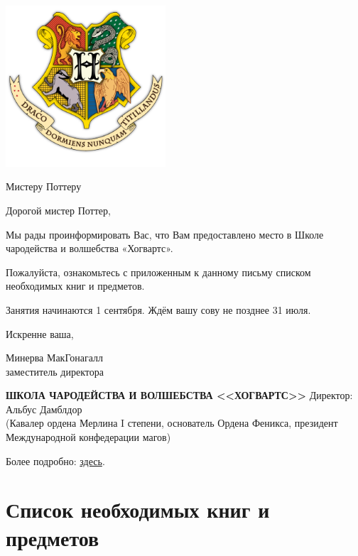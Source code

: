 \documentclass[14pt, a4paper]{article}
\begin{document}
	
\begin{titlepage}
\cfoot{}

	\begin{center}
	\includegraphics[height=6cm]{Hogwarts.png}
	\end{center}

{\fontsize{12pt}{1cm}\selectfont 
	Мистеру Поттеру}

\vspace{2.5cm}

Дорогой мистер Поттер,\par
Мы рады проинформировать Вас, что Вам предоставлено место в Школе чародейства и волшебства «Хогвартс».\par Пожалуйста, ознакомьтесь с приложенным к данному письму списком необходимых книг и предметов.\par
Занятия начинаются 1 сентября. Ждём вашу сову не позднее 31 июля. \par
Искренне ваша, \par
{ }\par
Минерва МакГонагалл\\
заместитель директора


\vfill
\begin{center}
	
	{\bfseries ШКОЛА ЧАРОДЕЙСТВА И ВОЛШЕБСТВА <<ХОГВАРТС>>}
	Директор: Альбус Дамблдор\\
	(Кавалер ордена Мерлина I степени, основатель Ордена Феникса,  президент Международной конфедерации магов)
	
\end{center}
	{\small Более подробно: \href{http://vhogwarts.ru}{здесь}.}

\end{titlepage}

\newpage

\thispagestyle{fancy}

\section{Список необходимых книг и предметов}
\end{document}
